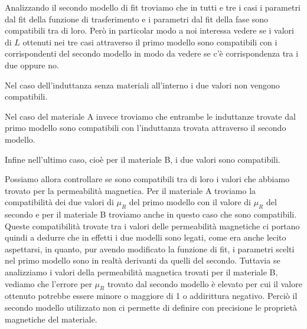 \documentclass[
    prl,
    floatfix,
    reprint, 
    superscriptaddress, 
    altaffilletter, 
    amsmath, 
    amssymb, 
    a4paper]{revtex4-2}
\begin{document}
Analizzando il secondo modello di fit troviamo che in tutti e tre i casi i parametri dal fit della funzione di trasferimento e i parametri dal fit della fase sono compatibili tra di loro. Però in particolar modo a noi interessa vedere se i valori di $L$ ottenuti nei tre casi attraverso il primo modello sono compatibili con i corrispondenti del secondo modello in modo da vedere se c'è corrispondenza tra i due oppure no. 

Nel caso dell'induttanza senza materiali all'interno i due valori non vengono compatibili.

Nel caso del materiale A invece troviamo che entrambe le induttanze trovate dal primo modello sono compatibili con l'induttanza trovata attraverso il secondo modello.

Infine nell'ultimo caso, cioè per il materiale B, i due valori sono compatibili. 

Possiamo allora controllare se sono compatibili tra di loro i valori che abbiamo trovato per la permeabilità magnetica. 
Per il materiale A troviamo la compatibilità dei due valori di $\mu_R$ del primo modello con il valore di $\mu_R$ del secondo e per il materiale B troviamo anche in questo caso che sono compatibili. Queste compatibilità trovate tra i valori delle permeabilità magnetiche ci portano quindi a dedurre che in effetti i due modelli sono legati, come era anche lecito aspettarsi, in quanto, pur avendo modificato la funzione di fit, i parametri scelti nel primo modello sono in realtà derivanti da quelli del secondo.
Tuttavia se analizziamo i valori della permeabilità magnetica trovati per il materiale B, vediamo che l'errore per $\mu_R$ trovato dal secondo modello è elevato per cui il valore ottenuto potrebbe essere minore o maggiore di 1 o addirittura negativo. Perciò il secondo modello utilizzato non ci permette di definire con precisione le proprietà magnetiche del materiale. 








\end{document}
